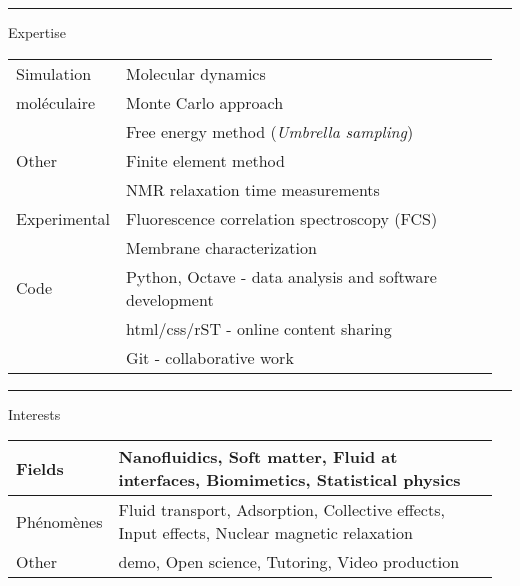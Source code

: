 \documentclass[a4paper,11pt]{concours}
\begin{document}
\newpage

\vspace{0.5cm}

\noindent\begin{minipage}{0.135\linewidth}
{\color{gray120}\rule{\textwidth}{0.22cm}\relax}
\end{minipage}
\begin{minipage}{0.82\linewidth}
{\textcolor{gray120}{\huge Expertise}}
\end{minipage}

\begin{table}[htbp]
\begin{tabular}{@{} p{0.12\linewidth} p{0.84\linewidth} @{}}
Simulation & Molecular dynamics \\
moléculaire      & Monte Carlo approach \\ 
      & Free energy method (\textit{Umbrella sampling}) \\
\hline \hline
Other     & Finite element method \\
      & NMR relaxation time measurements \\
\hline \hline
Experimental & Fluorescence correlation spectroscopy (FCS) \\
     & Membrane characterization \\
\hline \hline
Code &  Python, Octave - data analysis and software development \\
   & html/css/rST - online content sharing \\
   & Git - collaborative work \\
\end{tabular}
\end{table}

\vspace{0.5cm}

\noindent\begin{minipage}{0.135\linewidth}
{\color{gray120}\rule{\textwidth}{0.22cm}\relax}
\end{minipage}
\begin{minipage}{0.82\linewidth}
{\textcolor{gray120}{\huge Interests}}
\end{minipage}

\begin{table}[htbp]
\begin{tabular}{@{} p{0.12\linewidth} p{0.84\linewidth} @{}}
      Fields & Nanofluidics, Soft matter, Fluid at interfaces, Biomimetics, Statistical physics \\
\hline \hline
Phénomènes & Fluid transport, Adsorption, Collective effects, Input effects, Nuclear magnetic relaxation \\ 
\hline \hline
Other & demo, Open science, Tutoring, Video production \\
\end{tabular}
\end{table}
\end{document}
